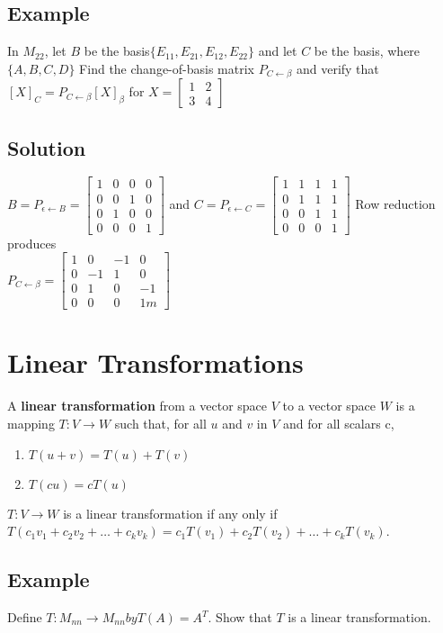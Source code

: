 \subsection*{Example}
In $M_22$, let $B$ be the basis$\{E_{11}, E_{21}, E_{12}, E_{22}\}$ and let $C$ be the basis, where $\{A, B, C, D\}$
Find the change-of-basis matrix $P_{C\leftarrow \beta}$ and verify that $[X]_C = P_{C\leftarrow \beta}[X]_\beta$ for $X = \begin{bmatrix}
    1&2\\3&4
\end{bmatrix}$
\subsection*{Solution}
$B = P_{\epsilon\leftarrow B} = \begin{bmatrix}
    1&0&0&0\\0&0&1&0\\0&1&0&0\\0&0&0&1
\end{bmatrix}$ and $C = P_{\epsilon\leftarrow C} = \begin{bmatrix}
    1&1&1&1\\0&1&1&1\\0&0&1&1\\0&0&0&1
\end{bmatrix}$
Row reduction produces \\$P_{C\leftarrow \beta} = \begin{bmatrix}
    1&0&-1&0\\0&-1&1&0\\0&1&0&-1\\0&0&0&1m
\end{bmatrix}$

\section{Linear Transformations}
A \textbf{linear transformation} from a vector space $V$ to a vector space $W$ is a mapping $T: V\rightarrow W$ such that, for all $u$ and $v$ in $V$ and for all scalars c,\\
\begin{enumerate}
    \item $T(u+v) = T(u) + T(v)$
    \item $T(cu) = cT(u)$
\end{enumerate}
$T: V\rightarrow W$ is a linear transformation if any only if $T(c_1v_1 + c_2v_2 +\dots+ c_kv_k) = c_1T(v_1) + c_2T(v_2) +\dots + c_kT(v_k)$.
\subsection*{Example}
Define $T: M_{nn}\rightarrow M_{nn} by T(A) = A^T.$ Show that $T$ is a linear transformation.
